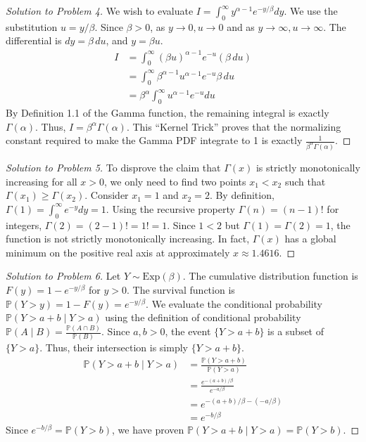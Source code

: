 \documentclass[11pt, a4paper]{article}
\theoremstyle{definition}
\theoremstyle{remark}
\newcommand{\Prob}{\mathbb{P}}
\begin{document}
\begin{proof}[Solution to Problem 4]
We wish to evaluate $I = \int_{0}^{\infty} y^{\alpha-1} e^{-y/\beta} dy$.
We use the substitution $u = y/\beta$. Since $\beta > 0$, as $y \to 0, u \to 0$ and as $y \to \infty, u \to \infty$.
The differential is $dy = \beta \, du$, and $y = \beta u$.
\begin{align*}
I &= \int_{0}^{\infty} (\beta u)^{\alpha-1} e^{-u} (\beta \, du) \\
&= \int_{0}^{\infty} \beta^{\alpha-1} u^{\alpha-1} e^{-u} \beta \, du \\
&= \beta^\alpha \int_{0}^{\infty} u^{\alpha-1} e^{-u} du
\end{align*}
By Definition 1.1 of the Gamma function, the remaining integral is exactly $\Gamma(\alpha)$.
Thus, $I = \beta^\alpha \Gamma(\alpha)$. This ``Kernel Trick'' proves that the normalizing constant required to make the Gamma PDF integrate to 1 is exactly $\frac{1}{\beta^\alpha \Gamma(\alpha)}$.
\end{proof}

\begin{proof}[Solution to Problem 5]
To disprove the claim that $\Gamma(x)$ is strictly monotonically increasing for all $x > 0$, we only need to find two points $x_1 < x_2$ such that $\Gamma(x_1) \ge \Gamma(x_2)$.
Consider $x_1 = 1$ and $x_2 = 2$.
By definition, $\Gamma(1) = \int_0^\infty e^{-y} dy = 1$.
Using the recursive property $\Gamma(n) = (n-1)!$ for integers, $\Gamma(2) = (2-1)! = 1! = 1$.
Since $1 < 2$ but $\Gamma(1) = \Gamma(2) = 1$, the function is not strictly monotonically increasing. In fact, $\Gamma(x)$ has a global minimum on the positive real axis at approximately $x \approx 1.4616$.
\end{proof}

\begin{proof}[Solution to Problem 6]
Let $Y \sim \text{Exp}(\beta)$. The cumulative distribution function is $F(y) = 1 - e^{-y/\beta}$ for $y > 0$. The survival function is $\Prob(Y > y) = 1 - F(y) = e^{-y/\beta}$.
We evaluate the conditional probability $\Prob(Y > a + b \mid Y > a)$ using the definition of conditional probability $\Prob(A \mid B) = \frac{\Prob(A \cap B)}{\Prob(B)}$.
Since $a, b > 0$, the event $\{Y > a + b\}$ is a subset of $\{Y > a\}$. Thus, their intersection is simply $\{Y > a + b\}$.
\begin{align*}
\Prob(Y > a + b \mid Y > a) &= \frac{\Prob(Y > a + b)}{\Prob(Y > a)} \\
&= \frac{e^{-(a+b)/\beta}}{e^{-a/\beta}} \\
&= e^{-(a+b)/\beta - (-a/\beta)} \\
&= e^{-b/\beta}
\end{align*}
Since $e^{-b/\beta} = \Prob(Y > b)$, we have proven $\Prob(Y > a + b \mid Y > a) = \Prob(Y > b)$.
\end{proof}
\end{document}
